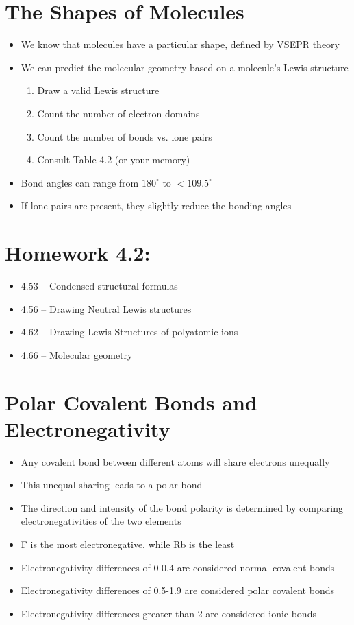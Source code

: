 \documentclass[12pt, openany, letterpaper]{memoir}
\begin{document}
\section{The Shapes of Molecules}
\begin{itemize}
	\item We know that molecules have a particular shape, defined by VSEPR theory
	\item We can predict the molecular geometry based on a molecule's Lewis structure
	      \begin{enumerate}
		      \item Draw a valid Lewis structure
		      \item Count the number of electron domains
		      \item Count the number of bonds vs. lone pairs
		      \item Consult Table 4.2 (or your memory)
	      \end{enumerate}
	\item Bond angles can range from $180^\circ$ to $<109.5^\circ$
	\item If lone pairs are present, they slightly reduce the bonding angles
\end{itemize}

\section*{Homework 4.2:}
\begin{itemize}
	\item 4.53 -- Condensed structural formulas
	\item 4.56 -- Drawing Neutral Lewis structures
	\item 4.62 -- Drawing Lewis Structures of polyatomic ions
	\item 4.66 -- Molecular geometry
\end{itemize}

\section{Polar Covalent Bonds and Electronegativity}
\begin{itemize}
	\item Any covalent bond between different atoms will share electrons unequally
	\item This unequal sharing leads to a polar bond
	\item The direction and intensity of the bond polarity is determined by comparing electronegativities of the two elements
	\item F is the most electronegative, while Rb is the least
	\item Electronegativity differences of 0-0.4 are considered normal covalent bonds
	\item Electronegativity differences of 0.5-1.9 are considered polar covalent bonds
	\item Electronegativity differences greater than 2 are considered ionic bonds
\end{itemize}
\end{document}
